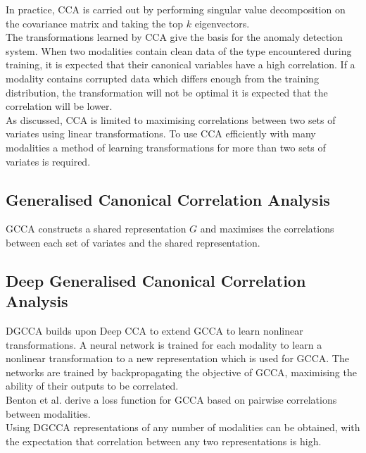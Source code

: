 In practice, CCA is carried out by performing singular value decomposition on the covariance matrix and taking the top $k$ eigenvectors. \\

The transformations learned by CCA give the basis for the anomaly detection system. When two modalities contain clean data of the type encountered during training, it is expected that their canonical variables have a high correlation. If a modality contains corrupted data which differs enough from the training distribution, the transformation will not be optimal it is expected that the correlation will be lower.\\

As discussed, CCA is limited to maximising correlations between two sets of variates using linear transformations. To use CCA efficiently with many modalities a method of learning transformations for more than two sets of variates is required.

\subsection{Generalised Canonical Correlation Analysis}
GCCA \cite{GCCA} constructs a shared representation $G$ and maximises the correlations between each set of variates and the shared representation.

\subsection{Deep Generalised Canonical Correlation Analysis}
DGCCA builds upon Deep CCA \cite{DCCA} to extend GCCA to learn nonlinear transformations. A neural network is trained for each modality to learn a nonlinear transformation to a new representation which is used for GCCA. The networks are trained by backpropagating the objective of GCCA, maximising the ability of their outputs to be correlated.\\

Benton et al. \cite{DGCCA} derive a loss function for GCCA based on pairwise correlations between modalities.\\

Using DGCCA representations of any number of modalities can be obtained, with the expectation that correlation between any two representations is high.

